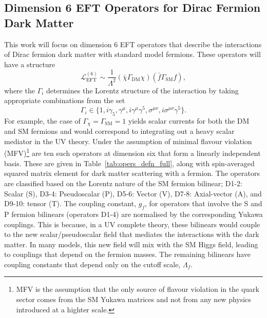 \subsection{Dimension 6 EFT Operators for Dirac Fermion Dark Matter}
This work will focus on dimension 6 EFT operators that describe the interactions of Dirac fermion dark matter with standard model fermions. These operators will have a structure 
\begin{equation}
    \mathcal{L}_\mathrm{EFT}^{(6)} \sim \frac{1}{\Lambda^2}(\bar{\chi}\Gamma_\mathrm{DM} \chi)(\bar{f}\Gamma_{\mathrm{SM}}f),
\end{equation}
where the $\Gamma_i$ determines the Lorentz structure of the interaction by taking appropriate combinations from the set
\begin{equation}
    \Gamma_i\in \{1, i\gamma_5, \gamma^\mu, i\gamma^\mu \gamma^5, \sigma^{\mu\nu}, i \sigma^{\mu\nu}\gamma^5\}.
\end{equation}
For example, the case of $\Gamma_\chi = \Gamma_\mathrm{SM} = 1$ yields scalar currents for both the DM and SM fermions and would correspond to integrating out a heavy scalar mediator in the UV theory. Under the assumption of minimal flavour violation (MFV)\footnote{MFV is the assumption that the only source of flavour violation in the quark sector comes from the SM Yukawa matrices and not from any new physics introduced at a highter scale.} are ten such operators at dimension six that form a linearly independent basis. These are given in Table~\ref{tab:opers_defn_full}, along with spin-averaged squared matrix element for dark matter scattering with a fermion. 
The operators are classified based on the Lorentz nature of the SM fermion bilinear; D1-2: Scalar (S), D3-4: Pseudoscalar (P), D5-6: Vector (V), D7-8: Axial-vector (A), and D9-10: tensor (T).
The coupling constant, $g_f$, for operators that involve the S and P fermion bilinears (operators D1-4) are normalised by the corresponding Yukawa couplings. This is because, in a UV complete theory, these bilinears would couple to the new scalar/pseudoscalar field that mediates the interactions with the dark matter. In many models, this new field will mix with the SM Higgs field, leading to couplings that depend on the fermion masses. The remaining bilinears have coupling constants that depend only on the cutoff scale, $\Lambda_f$.



